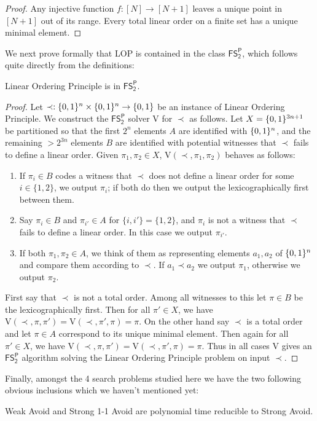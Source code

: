 \begin{proof}
Any injective function $f: [N] \to [N+1]$ leaves a unique point in $[N+1]$ out of its range. Every total linear order on a finite set has a unique minimal element.
\end{proof}
We next prove formally that {\sc LOP} is contained in the class $\mathsf{FS_2^P}$, which follows quite directly from the definitions:
\begin{lemma}\label{lem:lop-in-s2p}
{\sc Linear Ordering Principle} is in $\mathsf{FS_2^P}$.
\end{lemma}
\begin{proof}
Let $\prec: \{0,1\}^n \times \{0,1\}^n \to \{0,1\}$ be an instance of {\sc Linear Ordering Principle}. We construct the $\mathsf{FS_2^P}$ solver $\mathrm{V}$ for $\prec$ as follows. Let $X = \{0,1\}^{3n+1}$ be partitioned so that the first $2^n$ elements $A$ are identified with $\{0,1\}^n$, and the remaining $>2^{3n}$ elements $B$ are identified with potential witnesses that $\prec$ fails to define a linear order. Given $\pi_1,\pi_2 \in X$, $\mathrm{V}(\prec, \pi_1,\pi_2)$ behaves as follows:
\begin{enumerate}
    \item If $\pi_i \in B$ codes a witness that $\prec$ does not define a linear order for some $i \in \{1,2\}$, we output $\pi_i$; if both do then we output the lexicographically first between them.
    \item Say $\pi_i \in B$ and $\pi_{i'} \in A$ for $\{i,i'\}=\{1,2\}$, and $\pi_i$ is not a witness that $\prec$ fails to define a linear order. In this case we output $\pi_{i'}$.
    \item If both $\pi_1,\pi_2 \in A$, we think of them as representing elements $a_1,a_2$ of $\{0,1\}^n$ and compare them according to $\prec$. If $a_1 \prec a_2$ we output $\pi_1$, otherwise we output $\pi_2$.
\end{enumerate}
First say that $\prec$ is not a total order. Among all witnesses to this let $\pi \in B$ be the lexicographically first. Then for all $\pi' \in X$, we have $\mathrm{V}(\prec,\pi,\pi')=\mathrm{V}(\prec,\pi',\pi)=\pi$. On the other hand say $\prec$ is a total order and let $\pi \in A$ correspond to its unique minimal element. Then again for all $\pi' \in X$, we have $\mathrm{V}(\prec,\pi,\pi')=\mathrm{V}(\prec,\pi',\pi)=\pi$. Thus in all cases $\mathrm{V}$ gives an $\mathsf{FS_2^P}$ algorithm solving the {\sc Linear Ordering Principle} problem on input $\prec$.
\end{proof}
Finally, amongst the 4 search problems studied here we have the two following obvious inclusions which we haven't mentioned yet:
\begin{observation}
{\sc Weak Avoid} and {\sc Strong 1-1 Avoid} are polynomial time reducible to {\sc Strong Avoid}.
\end{observation}
